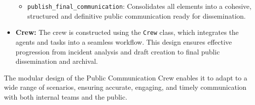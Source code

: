 \begin{itemize}
\begin{itemize}
        \item \texttt{publish\_final\_communication}: Consolidates all elements into a cohesive, structured and definitive public communication ready for dissemination.
    \end{itemize}
    \item \textbf{Crew:}
    The crew is constructed using the \texttt{Crew} class, which integrates the agents and tasks into a seamless workflow. This design ensures effective progression from incident analysis and draft creation to final public dissemination and archival.
\end{itemize}
The modular design of the Public Communication Crew enables it to adapt to a wide range of scenarios, ensuring accurate, engaging, and timely communication with both internal teams and the public.
